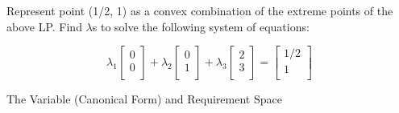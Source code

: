 Represent point (1/2, 1) as a convex combination of the extreme points of the above LP.  Find $\lambda$s to solve the following system of equations:

$$\lambda_1 \left[
  \begin{array}{c}
  0 \\
  0 \\
  \end{array} \right]+
 \lambda_2 \left[
  \begin{array}{c}
  0 \\
  1 \\
  \end{array} \right] +
 \lambda_3 \left[
  \begin{array}{c}
  2 \\
  3 \\
  \end{array} \right]  =
 \left[
  \begin{array}{c}
  1/2 \\
  1 \\
  \end{array} \right] 
$$


\newpage The Variable (Canonical Form) and Requirement Space 

